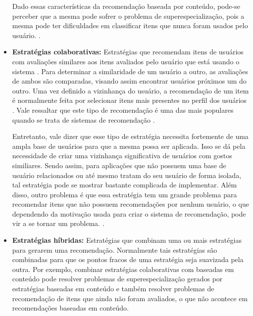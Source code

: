 \begin{itemize}
        Dado essas características da recomendação baseada por conteúdo, pode-se
        perceber que a mesma pode sofrer o problema de superespecialização, pois
        a mesma pode ter dificuldades em classificar itens que nunca foram
        usados pelo usuário. \cite{lops2011content}.

    \item \textbf{Estratégias colaborativas:} Estratégias que recomendam itens
        de usuários com avaliações similares aos itens avaliados pelo usuário
        que está usando o sistema \cite{schafer2007collaborative}.
        Para determinar a similaridade de um usuário a outro, as avaliações de
        ambos são comparadas, visando assim encontrar usuários próximos um do
        outro. Uma vez definido a vizinhança do usuário, a recomendação de um
        item é normalmente feita por selecionar itens mais presentes no perfil
        dos usuários \cite{araujo2011apprecommender}. Vale ressaltar que este tipo de recomendação é uma das mais
        populares quando se trata de sistemas de recomendação
        \cite{ricci2011introduction}.

        Entretanto, vale dizer que esse tipo de estratégia necessita fortemente
        de uma ampla base de usuários para que a mesma possa ser aplicada. Isso
        se dá pela necessidade de criar uma vizinhança significativa de usuários
        com gostos similiares. Sendo assim, para aplicações que não possuem uma
        base de usuário relacionados ou até mesmo tratam do seu usuário de forma
        isolada, tal estratégia pode se mostrar bastante complicada de
        implementar. Além disso, outro problema é que essa estratégia tem um
        grande problema para recomendar itens que não possuem recomendações por
        nenhum usuário, o que dependendo da motivação usada para criar o sistema
        de recomendação, pode vir a se tornar um problema.
        \cite{ricci2011introduction}.


    \item \textbf{Estratégias híbridas: } Estratégias que combinam uma ou mais
        estratégias para gerarem uma recomendação. Normalmente tais estratégias
        são combinadas para que os pontos fracos de uma estratégia seja
        suavizada pela outra. Por exemplo, combinar estratégias colaborativas com
        baseadas em conteúdo pode resolver problemas de superespecialização
        gerados por estratégias baseadas em conteúdo e também resolver problemas
        de recomendação de itens que ainda não foram avaliados, o que não
        acontece em recomendações baseadas em conteúdo.

\end{itemize}

